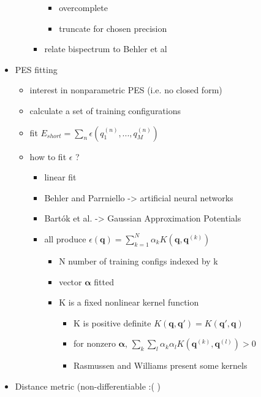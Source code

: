 \documentclass[11pt]{article}
\providecommand{\tightlist}{%
      \setlength{\itemsep}{0pt}\setlength{\parskip}{0pt}}
\begin{document}
\begin{itemize}
\begin{itemize}
\begin{itemize}
      \begin{itemize}
      \tightlist
      \item
        overcomplete
      \item
        truncate for chosen precision
      \end{itemize}
    \item
      relate bispectrum to Behler et al
    \end{itemize}
  \end{itemize}
\item
  PES fitting

  \begin{itemize}
  \tightlist
  \item
    interest in nonparametric PES (i.e. no closed form)
  \item
    calculate a set of training configurations
  \item
    fit \(E_{short} = \sum_n \epsilon(q_1^{(n)},...,q_M^{(n)})\)
  \item
    how to fit \(\epsilon\) ?

    \begin{itemize}
    \tightlist
    \item
      linear fit
    \item
      Behler and Parrniello -\textgreater{} artificial neural networks
    \item
      Bartók et al. -\textgreater{} Gaussian Approximation Potentials
    \item
      all produce
      \(\epsilon(\mathbf{q}) = \sum_{k=1}^N \alpha_k K(\mathbf{q},\mathbf{q}^{(k)})\)

      \begin{itemize}
      \tightlist
      \item
        N number of training configs indexed by k
      \item
        vector \(\mathbf{\alpha}\) fitted
      \item
        K is a fixed nonlinear kernel function

        \begin{itemize}
        \tightlist
        \item
          K is positive definite
          \(K(\mathbf{q}, \mathbf{q'}) = K(\mathbf{q'}, \mathbf{q})\)
        \item
          for nonzero \(\mathbf{\alpha}\),
          \(\sum_k \sum_l \alpha_k \alpha_l K(\mathbf{q}^{(k)}, \mathbf{q}^{(l)}) > 0\)
        \item
          Rasmussen and Williams present some kernels
        \end{itemize}
      \end{itemize}
    \end{itemize}
  \end{itemize}
\item
  Distance metric (non-differentiable :( )


\end{itemize}
\end{document}
